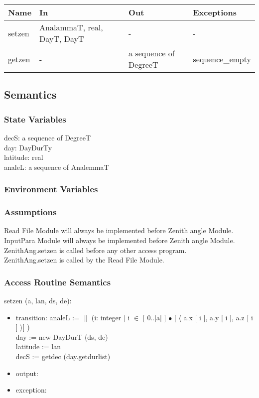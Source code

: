 \documentclass[12pt, titlepage]{article}
\begin{document}
\begin{center}
\begin{tabular}{p{2cm} p{5cm} p{4cm} p{1cm}}
\hline
\textbf{Name} & \textbf{In} & \textbf{Out} & \textbf{Exceptions} \\
\hline 
setzen & AnalammaT, real, DayT, DayT & -  & -\\
getzen &  -  & a sequence of DegreeT & sequence\_empty \\

\hline
\end{tabular}
\end{center}


\subsection{Semantics}

\subsubsection{State Variables}

decS: a sequence of DegreeT\\
day: DayDurTy\\
latitude: real\\
analeL: a sequence of AnalemmaT

\subsubsection{Environment Variables}




\subsubsection{Assumptions}
Read File Module will always be implemented before Zenith angle Module.\\
InputPara Module will always be implemented before Zenith angle Module.\\
ZenithAng.setzen is called before any other access program.\\
ZenithAng.setzen is called by the Read File Module.


\subsubsection{ Access Routine Semantics}


\noindent setzen (a, lan, ds, de):
\begin{itemize}
\item transition: analeL := $\|$ (i: integer $|$ i $\in$ [ 0..$|$a$|$ ] $\bullet	$ [ $\langle$ a.x [ i ], a.y [ i ], a.z [ i ] $\rangle$] )\\
day := new DayDurT (ds, de)\\
latitude := lan\\
decS := getdec (day.getdurlist)
\item output: 
\item exception: 
\end{itemize}
\end{document}
